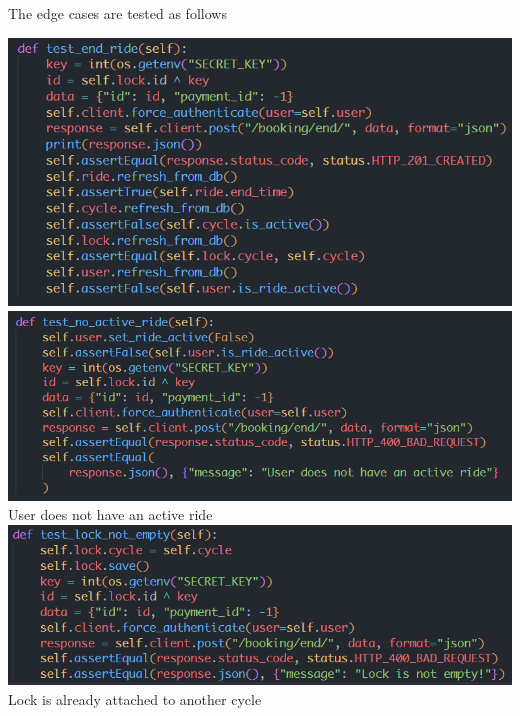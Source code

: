 \documentclass[11pt]{article}
\begin{document}
The edge cases are tested as follows
\begin{center}
    \includegraphics[scale=0.75]{unit_testing_codes/end_ride_1.png}\\
    \includegraphics[scale=0.7]{unit_testing_codes/end_ride_2.png}\\
    User does not have an active ride\\
    \includegraphics[scale=0.72]{unit_testing_codes/end_ride_3.png}\\
    Lock is already attached to another cycle\\
\end{center}
\end{document}
